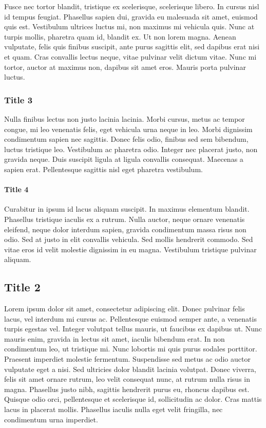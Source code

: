 \documentclass{ideathon2026}
\begin{document}
Fusce nec tortor blandit, tristique ex scelerisque, scelerisque libero. In cursus nisl id tempus feugiat. Phasellus sapien dui, gravida eu malesuada sit amet, euismod quis est. Vestibulum ultrices luctus mi, non maximus mi vehicula quis. Nunc at turpis mollis, pharetra quam id, blandit ex. Ut non lorem magna. Aenean vulputate, felis quis finibus suscipit, ante purus sagittis elit, sed dapibus erat nisi et quam. Cras convallis lectus neque, vitae pulvinar velit dictum vitae. Nunc mi tortor, auctor at maximus non, dapibus sit amet eros. Mauris porta pulvinar luctus.

\subsubsection{Title 3}

Nulla finibus lectus non justo lacinia lacinia. Morbi cursus, metus ac tempor congue, mi leo venenatis felis, eget vehicula urna neque in leo. Morbi dignissim condimentum sapien nec sagittis. Donec felis odio, finibus sed sem bibendum, luctus tristique leo. Vestibulum ac pharetra odio. Integer nec placerat justo, non gravida neque. Duis suscipit ligula at ligula convallis consequat. Maecenas a sapien erat. Pellentesque sagittis nisl eget pharetra vestibulum.

\paragraph{Title 4}

Curabitur in ipsum id lacus aliquam suscipit. In maximus elementum blandit. Phasellus tristique iaculis ex a rutrum. Nulla auctor, neque ornare venenatis eleifend, neque dolor interdum sapien, gravida condimentum massa risus non odio. Sed at justo in elit convallis vehicula. Sed mollis hendrerit commodo. Sed vitae eros id velit molestie dignissim in eu magna. Vestibulum tristique pulvinar aliquam.

\subsection{Title 2}

Lorem ipsum dolor sit amet, consectetur adipiscing elit. Donec pulvinar felis lacus, vel interdum mi cursus ac. Pellentesque euismod semper ante, a venenatis turpis egestas vel. Integer volutpat tellus mauris, ut faucibus ex dapibus ut. Nunc mauris enim, gravida in lectus sit amet, iaculis bibendum erat. In non condimentum leo, ut tristique mi. Nunc lobortis mi quis purus sodales porttitor. Praesent imperdiet molestie fermentum. Suspendisse sed metus ac odio auctor vulputate eget a nisi. Sed ultricies dolor blandit lacinia volutpat. Donec viverra, felis sit amet ornare rutrum, leo velit consequat nunc, at rutrum nulla risus in magna. Phasellus justo nibh, sagittis hendrerit purus eu, rhoncus dapibus est. Quisque odio orci, pellentesque et scelerisque id, sollicitudin ac dolor. Cras mattis lacus in placerat mollis. Phasellus iaculis nulla eget velit fringilla, nec condimentum urna imperdiet.
\end{document}
